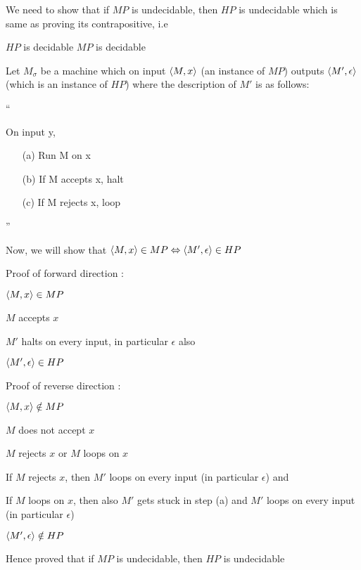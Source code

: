 We need to show that if $MP$ is undecidable, then $HP$ is undecidable which is same as proving its contrapositive, i.e

$HP$ is decidable \imp $MP$ is decidable

Let $M_\sigma$ be a machine which on input $\langle M, x \rangle$ (an instance of $MP$) outputs $ \langle M', \epsilon\rangle $ (which is an instance of $HP$) where the description of $M'$ is as follows:

``

On input y,
\begin{enumerate}
    \item[(a)] Run M on x
    \item[(b)] If M accepts x, halt
    \item[(c)] If M rejects x, loop
\end{enumerate}

''

Now, we will show that $\langle M, x \rangle \in MP \Leftrightarrow \langle M', \epsilon \rangle \in HP$

Proof of forward direction : 

$\langle M, x \rangle \in MP$

\imp
$M$ accepts $x$

\imp
$M'$ halts on every input, in particular $\epsilon$ also

\imp
$\langle M', \epsilon \rangle \in HP$


Proof of reverse direction : 

$\langle M, x \rangle \notin MP$

\imp
$M$ does not accept $x$

\imp
$M$ rejects $x$ or $M$ loops on $x$

\imp
If $M$ rejects $x$, then $M'$ loops on every input (in particular $\epsilon$)
and

If $M$ loops on $x$, then also $M'$ gets stuck in step (a) and $M'$ loops on every input (in particular $\epsilon$)

\imp
$\langle M', \epsilon \rangle \notin HP$

Hence proved that if $MP$ is undecidable, then $HP$ is undecidable



